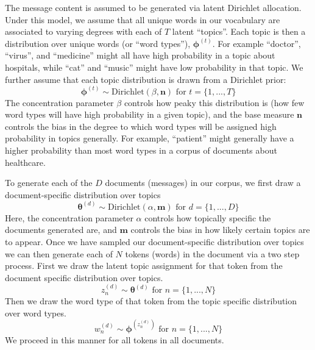 \documentclass{pnastwo}
\begin{document}
\begin{article}
The message content is assumed to be generated via latent Dirichlet allocation. Under this model, we assume that all unique words in our vocabulary are associated to varying degrees with each of $T$ latent ``topics''. Each topic is then a distribution over unique words (or ``word types''), $\boldsymbol{\phi}^{(t)}$. For example ``doctor'', ``virus'', and ``medicine'' might all have high probability in a topic about hospitals, while ``cat'' and ``music'' might have low probability in that topic. We further assume that each topic distribution is drawn from a Dirichlet prior: 
\begin{equation}
	\boldsymbol{\phi}^{(t)} \sim \text{Dirichlet}(\beta,\boldsymbol{n}) \text{ for } t = \{1, ..., T\}
\end{equation}
The concentration parameter $\beta$ controls how peaky this distribution is (how few word types will have high probability in a given topic), and the base measure $\boldsymbol{n}$ controls the bias in the degree to which word types will be assigned high probability in topics generally. For example, ``patient'' might generally have a higher probability than most word types in a corpus of documents about healthcare.   

To generate each of the $D$ documents (messages) in our corpus, we first draw a document-specific distribution over topics
\begin{equation}
	\boldsymbol{\theta}^{(d)} \sim \text{Dirichlet}(\alpha,\boldsymbol{m}) \text{ for } d = \{1,...,D\}
\end{equation}
Here, the concentration parameter $\alpha$ controls how topically specific the documents generated are, and $\boldsymbol{m}$ controls the bias in how likely certain topics are to appear. Once we have sampled our document-specific distribution over topics we can then generate each of $N$ tokens (words) in the document via a two step process. First we draw the latent topic assignment for that token from the document specific distribution over topics.
\begin{equation}
	z_n^{(d)} \sim \boldsymbol{\theta}^{(d)} \text{ for } n = \{1,...,N\}
\end{equation}
 Then we draw the word type of that token from the topic specific distribution over word types.
 \begin{equation}
 	w_n^{(d)} \sim \boldsymbol{\phi}^{(z_n^{(d)})} \text{ for } n = \{1,...,N\}
 \end{equation}
We proceed in this manner for all tokens in all documents. 


\end{article}
\end{document}
